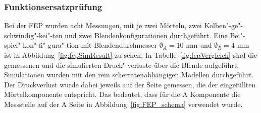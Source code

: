 \subsubsection{Funktionsersatzprüfung}
Bei der FEP wurden acht Messungen, mit je zwei Mörteln, zwei Kolben"-ge"-schwindig"-kei"-ten und zwei Blendenkonfigurationen durchgeführt. 
Eine Bei"-spiel"-kon"-fi"-gura"-tion mit Blendendurchmesser $\emptyset_A=10$ mm und $\emptyset_B=4$ mm ist in Abbildung~\ref{fig:fepSimResult} zu sehen.
In Tabelle~\ref{fig:fepVergleich} sind die gemessenen und die simulierten Druck"-verluste über die Blende aufgeführt. Simulationen wurden mit den rein scherratenabhängigen Modellen durchgeführt. 
Der Druckverlust wurde dabei jeweils auf der Seite gemessen, die der eingefüllten Mörtelkomponente entspricht.
Das bedeutet, dass für die A Komponente die Messstelle auf der A Seite in Abbildung~\ref{fig:FEP_schema} verwendet wurde.
%
